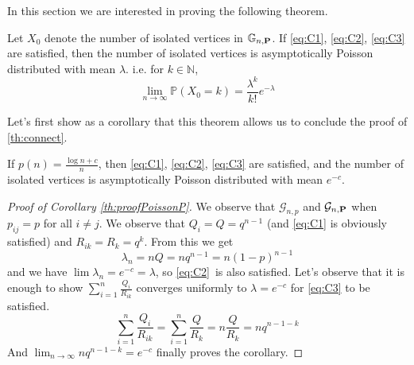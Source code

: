 In this section we are interested in proving the following theorem.
\begin{theorem}\label{th:CVIsolPoi}
	Let $X_0$ denote the number of isolated vertices in $\mathbb{G}_{n, \bold{P}}$. If \eqref{eq:C1}, \eqref{eq:C2}, \eqref{eq:C3} are satisfied, 
	then the number of isolated vertices is asymptotically Poisson distributed with mean $\lambda$.
	\newline
	i.e. for $k \in \mathbb{N}$, 
	\begin{equation}
		\lim_{n \to \infty} \mathbb{P}(X_0 = k) = \frac{\lambda^k}{k!}e^{-\lambda}
	\end{equation}
\end{theorem}
Let's first show as a corollary that this theorem allows us to conclude the proof of \ref{th:connect}.
\begin{corollary}\label{th:proofPoissonP}
	If $p(n) = \frac{\log n + c}{n}$, then \eqref{eq:C1}, \eqref{eq:C2}, \eqref{eq:C3} are satisfied, 
	and the number of isolated vertices is asymptotically Poisson distributed with mean $e^{-c}$.
\end{corollary}
\begin{proof}[Proof of Corollary \ref{th:proofPoissonP}]
	We observe that $\mathcal{G}_{n,p}$ and $\mathcal{G}_{n, \bold{P}}$ when $p_{ij} = p$ for all $i \neq j$.
	\newline
	We observe that $Q_i = Q = q^{n-1}$ (and \eqref{eq:C1} is obviously satisfied) and $R_{ik} = R_k = q^k$. 
	From this we get
	\begin{equation}
		\lambda_n = n Q = nq^{n-1} = n(1-p)^{n-1}
	\end{equation}
	and we have $\lim \lambda_n = e^{-c} = \lambda$, so \eqref{eq:C2} is also satisfied.
	\newline
	Let's observe that it is enough to show $\sum_{i=1}^n \frac{Q_i}{R_{ik}}$ converges uniformly to $\lambda = e^{-c}$ for \eqref{eq:C3} to be satisfied.
	\begin{equation}
		\sum_{i=1}^n \frac{Q_i}{R_{ik}} = \sum_{i=1}^n \frac{Q}{R_k} = n \frac{Q}{R_k} = nq^{n-1-k}
	\end{equation}
	And $\lim_{n \to \infty}  nq^{n-1-k} = e^{-c}$ finally proves the corollary.
\end{proof}
